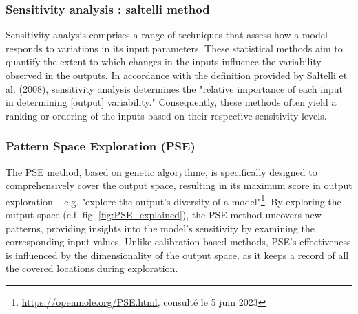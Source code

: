 \documentclass{article}
\begin{document}
    \subsubsection{Sensitivity analysis : saltelli method}

    Sensitivity analysis comprises a range of techniques that assess how a model responds to variations in its input parameters. These statistical methods aim to quantify the extent to which changes in the inputs influence the variability observed in the outputs. In accordance with the definition provided by Saltelli et al. (2008)\parencite{saltelli_global_2008}, sensitivity analysis determines the "relative importance of each input in determining [output] variability." Consequently, these methods often yield a ranking or ordering of the inputs based on their respective sensitivity levels.\\

    \subsubsection{Pattern Space Exploration (PSE)}
    The PSE \parencite{cherel_beyond_2015}  method, based on genetic algorythme, is specifically designed to comprehensively cover the output space, resulting in its maximum score in output exploration -- e.g. "explore the output's diversity of a model"\footnote{\url{https://openmole.org/PSE.html}, consulté le 5 juin 2023}. By exploring the output space (c.f. fig. \ref{fig:PSE_explained}), the PSE method uncovers new patterns, providing insights into the model's sensitivity by examining the corresponding input values. Unlike calibration-based methods, PSE's effectiveness is influenced by the dimensionality of the output space, as it keeps a record of all the covered locations during exploration.
\end{document}
